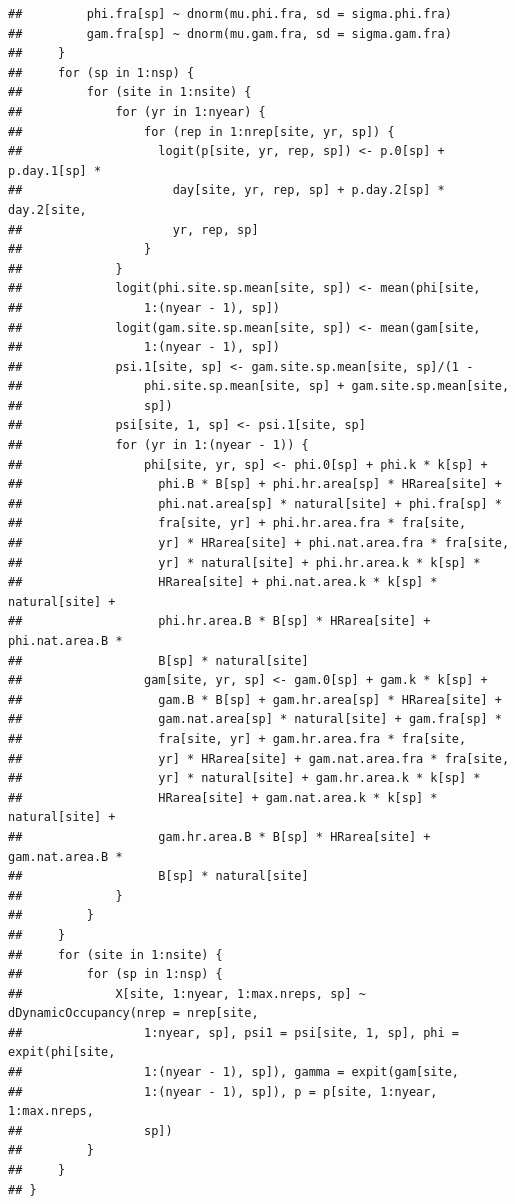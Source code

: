 \documentclass{article}\usepackage[]{graphicx}\usepackage[]{color}
\makeatletter
\newenvironment{kframe}{%
 \def\at@end@of@kframe{}%
 \ifinner\ifhmode%
  \def\at@end@of@kframe{\end{minipage}}%
  \begin{minipage}{\columnwidth}%
 \fi\fi%
 \def\FrameCommand##1{\hskip\@totalleftmargin \hskip-\fboxsep
 \colorbox{shadecolor}{##1}\hskip-\fboxsep
     \hskip-\linewidth \hskip-\@totalleftmargin \hskip\columnwidth}%
 \MakeFramed {\advance\hsize-\width
   \@totalleftmargin\z@ \linewidth\hsize
   \@setminipage}}%
 {\par\unskip\endMakeFramed%
 \at@end@of@kframe}
\newenvironment{knitrout}{}{} %
\makeatother
\begin{document}
\begin{knitrout}
\begin{kframe}
\begin{verbatim}
##         phi.fra[sp] ~ dnorm(mu.phi.fra, sd = sigma.phi.fra)
##         gam.fra[sp] ~ dnorm(mu.gam.fra, sd = sigma.gam.fra)
##     }
##     for (sp in 1:nsp) {
##         for (site in 1:nsite) {
##             for (yr in 1:nyear) {
##                 for (rep in 1:nrep[site, yr, sp]) {
##                   logit(p[site, yr, rep, sp]) <- p.0[sp] + p.day.1[sp] * 
##                     day[site, yr, rep, sp] + p.day.2[sp] * day.2[site, 
##                     yr, rep, sp]
##                 }
##             }
##             logit(phi.site.sp.mean[site, sp]) <- mean(phi[site, 
##                 1:(nyear - 1), sp])
##             logit(gam.site.sp.mean[site, sp]) <- mean(gam[site, 
##                 1:(nyear - 1), sp])
##             psi.1[site, sp] <- gam.site.sp.mean[site, sp]/(1 - 
##                 phi.site.sp.mean[site, sp] + gam.site.sp.mean[site, 
##                 sp])
##             psi[site, 1, sp] <- psi.1[site, sp]
##             for (yr in 1:(nyear - 1)) {
##                 phi[site, yr, sp] <- phi.0[sp] + phi.k * k[sp] + 
##                   phi.B * B[sp] + phi.hr.area[sp] * HRarea[site] + 
##                   phi.nat.area[sp] * natural[site] + phi.fra[sp] * 
##                   fra[site, yr] + phi.hr.area.fra * fra[site, 
##                   yr] * HRarea[site] + phi.nat.area.fra * fra[site, 
##                   yr] * natural[site] + phi.hr.area.k * k[sp] * 
##                   HRarea[site] + phi.nat.area.k * k[sp] * natural[site] + 
##                   phi.hr.area.B * B[sp] * HRarea[site] + phi.nat.area.B * 
##                   B[sp] * natural[site]
##                 gam[site, yr, sp] <- gam.0[sp] + gam.k * k[sp] + 
##                   gam.B * B[sp] + gam.hr.area[sp] * HRarea[site] + 
##                   gam.nat.area[sp] * natural[site] + gam.fra[sp] * 
##                   fra[site, yr] + gam.hr.area.fra * fra[site, 
##                   yr] * HRarea[site] + gam.nat.area.fra * fra[site, 
##                   yr] * natural[site] + gam.hr.area.k * k[sp] * 
##                   HRarea[site] + gam.nat.area.k * k[sp] * natural[site] + 
##                   gam.hr.area.B * B[sp] * HRarea[site] + gam.nat.area.B * 
##                   B[sp] * natural[site]
##             }
##         }
##     }
##     for (site in 1:nsite) {
##         for (sp in 1:nsp) {
##             X[site, 1:nyear, 1:max.nreps, sp] ~ dDynamicOccupancy(nrep = nrep[site, 
##                 1:nyear, sp], psi1 = psi[site, 1, sp], phi = expit(phi[site, 
##                 1:(nyear - 1), sp]), gamma = expit(gam[site, 
##                 1:(nyear - 1), sp]), p = p[site, 1:nyear, 1:max.nreps, 
##                 sp])
##         }
##     }
## }
\end{verbatim}
\end{kframe}
\end{knitrout}
\end{document}
